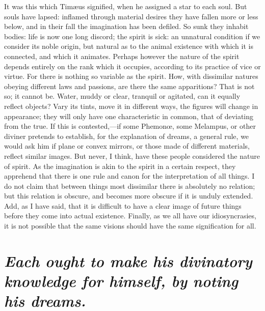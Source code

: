 \documentclass[12pt]{article}
\begin{document}
\noindent It was this which Tim{\ae}us signified, when he assigned a star to
each soul. But souls have lapsed: inflamed through material desires they have
fallen more or less below, and in their fall the imagination has been defiled.
So sunk they inhabit bodies: life is now one long discord; the spirit is sick:
an unnatural condition if we consider its noble origin, but natural as to the
animal existence with which it is connected, and which it animates. Perhaps
however the nature of the spirit depends entirely on the rank which it
occupies, according to its practice of vice or virtue. For there is nothing so
variable as the spirit. How, with dissimilar natures obeying different laws and
passions, are there the same apparitions? That is not so; it cannot be. Water,
muddy or clear, tranquil or agitated, can it equally reflect objects? Vary its
tints, move it in different ways, the figures will change in appearance; they
will only have one characteristic in common, that of deviating from the true.
If this is contested,---if some Phemon{\oe}, some Melampus, or other diviner
pretends to establish, for the explanation of dreams, a general rule, we would
ask him if plane or convex mirrors, or those made of different materials,
reflect similar images. But never, I think, have these people considered the
nature of spirit. As the imagination is akin to the spirit in a certain
respect, they apprehend that there is one rule and canon for the interpretation
of all things. I do not claim that between things most dissimilar there is
absolutely no relation; but this relation is obscure, and becomes more obscure
if it is unduly extended. Add, as I have said, that it is difficult to have a
clear image of future things before they come into actual existence. Finally,
as we all have our idiosyncrasies, it is not possible that the same visions
should have the same signification for all.


\section{\mdseries\itshape Each ought to make his divinatory knowledge for
himself, by noting his dreams.}
\end{document}
